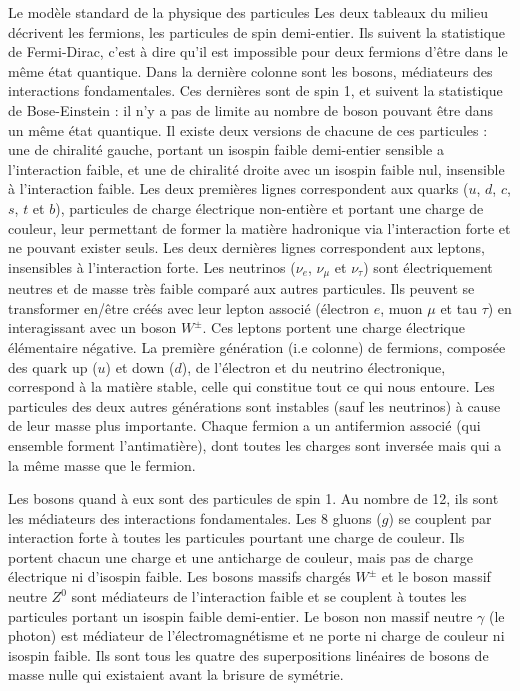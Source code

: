 \begin{figure*}[!htb!]
\begin{activitybox}[label=box::SM]{Le modèle standard de la physique des particules}
          Les deux tableaux du milieu décrivent les fermions, les particules de spin demi-entier. Ils suivent la statistique de Fermi-Dirac, c'est à dire qu'il est impossible pour deux fermions d'être dans le même état quantique. Dans la dernière colonne sont les bosons, médiateurs des interactions fondamentales. Ces dernières sont de spin 1, et suivent la statistique de Bose-Einstein : il n'y a pas de limite au nombre de boson pouvant être dans un même état quantique. Il existe deux versions de chacune de ces particules : une de chiralité gauche, portant un isospin faible demi-entier sensible a l'interaction faible, et une de chiralité droite avec un isospin faible nul, insensible à l'interaction faible. Les deux premières lignes correspondent aux quarks ($u$, $d$, $c$, $s$, $t$ et $b$), particules de charge électrique non-entière et portant une charge de couleur, leur permettant de former la matière hadronique via l'interaction forte et ne pouvant exister seuls. Les deux dernières lignes correspondent aux leptons, insensibles à l'interaction forte. Les neutrinos  ($\nu_e$, $\nu_{\mu}$ et $\nu_{\tau}$) sont électriquement neutres et de masse très faible comparé aux autres particules. Ils peuvent se transformer en/être créés avec leur lepton associé (électron $e$, muon $\mu$ et tau $\tau$) en interagissant avec un boson $W^{\pm}$. Ces leptons portent une charge électrique élémentaire négative. La première génération (i.e colonne) de fermions, composée des quark up ($u$) et down ($d$), de l'électron et du neutrino électronique, correspond à la matière stable, celle qui constitue tout ce qui nous entoure. Les particules des deux autres générations sont instables (sauf les neutrinos) à cause de leur masse plus importante. Chaque fermion a un antifermion associé (qui ensemble forment l'antimatière), dont toutes les charges sont inversée mais qui a la même masse que le fermion.
        
          Les bosons quand à eux sont des particules de spin 1. Au nombre de 12, ils sont les médiateurs des interactions fondamentales. Les 8 gluons ($g$) se couplent par interaction forte à toutes les particules pourtant une charge de couleur. Ils portent chacun une charge et une anticharge de couleur, mais pas de charge électrique ni d'isospin faible. Les bosons massifs chargés $W^{\pm}$ et le boson massif neutre $Z^0$ sont médiateurs de l'interaction faible et se couplent à toutes les particules portant un isospin faible demi-entier. Le boson non massif neutre $\gamma$ (le photon) est médiateur de l'électromagnétisme et ne porte ni charge de couleur ni isospin faible. Ils sont tous les quatre des superpositions linéaires de bosons de masse nulle qui existaient avant la brisure de symétrie.
        \end{activitybox}
      \end{figure*}

